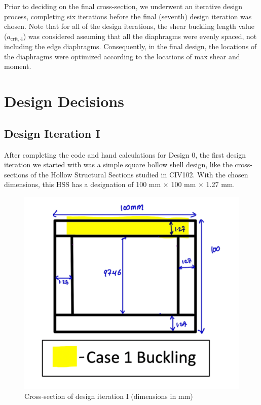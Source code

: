 \documentclass[11pt]{article}
\newcommand{\imagewidth}{.5\linewidth}
\begin{document}
Prior to deciding on the final cross-section, we underwent an iterative design process, completing six iterations before the final (seventh) design iteration was chosen. Note that for all of the design iterations, the shear buckling length value ($a_{\mathrm{crit,4}}$) was considered assuming that all the diaphragms were evenly spaced, not including the edge diaphragms. Consequently, in the final design, the locations of the diaphragms were optimized according to the locations of max shear and moment.

\section{Design Decisions}

\subsection{Design Iteration I}

After completing the code and hand calculations for Design 0, the first design iteration we started with was a simple square hollow shell design, like the cross-sections of the Hollow Structural Sections studied in CIV102. With the chosen dimensions, this HSS has a designation of 100 mm $\times$ 100 mm $\times$ 1.27 mm.

\begin{figure}[h]
    \centering
    \includegraphics[width=\imagewidth]{img/design-1-cs.png}
    \caption{Cross-section of design iteration I (dimensions in mm)}
    \label{d1}
\end{figure}
\end{document}
